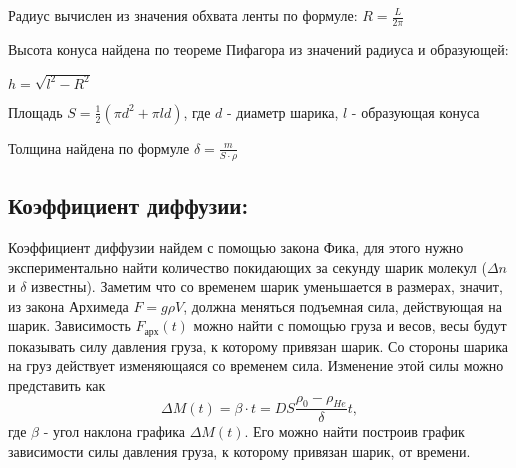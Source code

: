 \documentclass[12pt,a4paper]{article}
\begin{document}
        Радиус вычислен из значения обхвата ленты по формуле: $R = \frac{L}{2\pi}$
        
        Высота конуса найдена по теореме Пифагора из значений радиуса и образующей:
        
        $h = \sqrt{l^2 - R^2}$
        
        Площадь $S = \frac{1}{2}(\pi d^2 + \pi ld)$, где $d$ - диаметр шарика, $l$ - образующая конуса
        
        Толщина найдена по формуле $\delta = \frac{m}{S \cdot \rho}$


  
    \subsection{Коэффициент диффузии:}
        Коэффициент диффузии найдем с помощью закона Фика, для этого нужно экспериментально найти количество покидающих за секунду шарик молекул ($\Delta n$ и $\delta$ известны). Заметим что со временем шарик уменьшается в размерах, значит, из закона Архимеда $F = g \rho V$, должна меняться подъемная сила, действующая на шарик. Зависимость $F_{\text{арх}}(t)$ можно найти с помощью груза и весов, весы будут показывать силу давления груза, к которому привязан шарик.
        Со стороны шарика на груз действует изменяющаяся со временем сила. Изменение этой  силы можно представить как
        \[
        \Delta M(t) = \beta \cdot t = D S \frac{\rho_0 - \rho_{He}}{\delta} t,
        \]
        где $\beta$ - угол наклона графика $\Delta M(t)$. Его можно найти построив график  зависимости силы давления груза, к которому привязан шарик, от времени.
    \newpage
\end{document}
